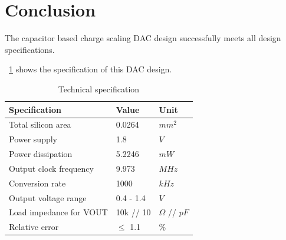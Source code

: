 \documentclass[journal]{IEEEtran}
\newcommand{\tref}[1]{\tablename~\ref{#1}}
\begin{document}
\section{Conclusion}

The capacitor based charge scaling DAC design successfully meets all design specifications.

\tref{tbl_spec} shows the specification of this DAC design.

\begin{table}[!t]
	\renewcommand{\arraystretch}{1.3}
	\caption{Technical specification}
	\label{tbl_spec}
	\centering
	\begin{tabular}{lll}
		\hline
		Specification		& Value		& Unit		\\
		\hline
		Total silicon area	& 0.0264	& $mm^2$	\\
		Power supply		& 1.8		& $V$		\\
		Power dissipation	& 5.2246	& $mW$		\\
		Output clock frequency	& 9.973		& $MHz$		\\
		Conversion rate		& 1000		& $kHz$		\\
		Output voltage range	& 0.4 - 1.4	& $V$		\\
		Load impedance for VOUT	& 10k // 10	& $\Omega$ // $pF$\\
		Relative error		& $\leqslant$ 1.1	& \%		\\
		\hline
	\end{tabular}
\end{table}




\end{document}
